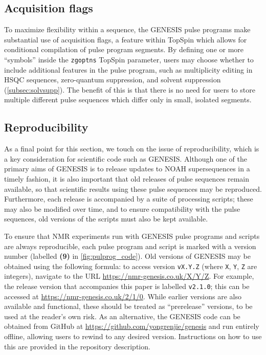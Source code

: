 \documentclass[a4paper,11pt]{article}
\begin{document}
\begin{refsection}
\subsection{Acquisition flags}
\label{subsec:zgoptns}

To maximize flexibility within a sequence, the GENESIS pulse programs make substantial use of acquisition flags, a feature within TopSpin which allows for conditional compilation of pulse program segments.
By defining one or more ``symbols'' inside the \texttt{zgoptns} TopSpin parameter, users may choose whether to include additional features in the pulse program, such as multiplicity editing in HSQC sequences, zero-quantum suppression\autocite{Thrippleton2003ACIE}, and solvent suppression (\cref{subsec:solvsupp}).
The benefit of this is that there is no need for users to store multiple different pulse sequences which differ only in small, isolated segments.

\subsection{Reproducibility}
\label{subsec:repro}

As a final point for this section, we touch on the issue of reproducibility, which is a key consideration for scientific code such as GENESIS.\autocite{Perkel2020N}
Although one of the primary aims of GENESIS is to release updates to NOAH supersequences in a timely fashion, it is also important that old releases of pulse sequences remain available, so that scientific results using these pulse sequences may be reproduced. 
Furthermore, each release is accompanied by a suite of processing scripts; these may also be modified over time, and to ensure compatibility with the pulse sequences, old versions of the scripts must also be kept available.

To ensure that NMR experiments run with GENESIS pulse programs and scripts are always reproducible, each pulse program and script is marked with a version number (labelled \textbf{(9)} in \cref{fig:pulprog_code}).
Old versions of GENESIS may be obtained using the following formula: to access version \texttt{vX.Y.Z} (where \texttt{X}, \texttt{Y}, \texttt{Z} are integers), navigate to the URL \url{https://nmr-genesis.co.uk/X/Y/Z}.
For example, the release version that accompanies this paper is labelled \texttt{v2.1.0}; this can be accessed at \url{https://nmr-genesis.co.uk/2/1/0}.
While earlier versions are also available and functional, these should be treated as ``prerelease'' versions, to be used at the reader's own risk.
As an alternative, the GENESIS code can be obtained from GitHub at \url{https://github.com/yongrenjie/genesis} and run entirely offline, allowing users to rewind to any desired version.
Instructions on how to use this are provided in the repository description.


\end{refsection}
\end{document}
